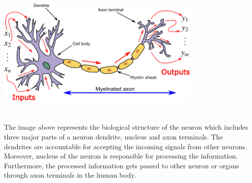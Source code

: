 \vspace{3mm}
\includegraphics[width=10cm]{Images/neuron.png} \\
\section*{}
The image above represents the biological structure of the neuron which includes three major parts of a neuron dendrite, nucleus and axon terminals.
The dendrites are accountable for accepting the incoming signals from other neurons. 
Moreover, nucleus of the neuron is responsible for processing the information. 
Furthermore, the processed information gets passed to other neuron or organs through axon terminals in the human body.
\pagebreak